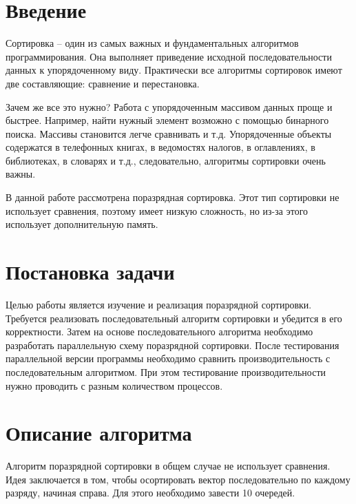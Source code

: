 \documentclass{report}
\begin{document}
	\tableofcontents

	\newpage
	

	\section*{Введение}
	\par Сортировка – один из самых важных и фундаментальных алгоритмов программирования. Она выполняет приведение исходной последовательности данных к упорядоченному виду. Практически все алгоритмы сортировок имеют две составляющие: сравнение и перестановка.
	
	\par Зачем же все это нужно? Работа с упорядоченным массивом данных проще и быстрее. Например, найти нужный элемент возможно с помощью бинарного поиска. Массивы становится легче сравнивать и т.д. Упорядоченные объекты содержатся в телефонных книгах, в ведомостях налогов, в оглавлениях, в библиотеках, в словарях и т.д., следовательно, алгоритмы сортировки очень важны.
	
	\par В данной работе рассмотрена поразрядная сортировка. Этот тип сортировки не использует сравнения, поэтому имеет низкую сложность, но из-за этого использует дополнительную память.
	
	\newpage
    \section*{Постановка задачи}
    \par Целью работы является изучение и реализация поразрядной сортировки. Требуется реализовать последовательный алгоритм сортировки и убедится в его корректности. Затем на основе последовательного алгоритма необходимо разработать параллельную схему поразрядной сортировки. После тестирования параллельной версии программы необходимо сравнить производительность с последовательным алгоритмом. При этом тестирование производительности нужно проводить с разным количеством процессов.
    
    \newpage
    \section*{Описание алгоритма}
    \par Алгоритм поразрядной сортировки в общем случае не использует сравнения. Идея заключается в том, чтобы осортировать вектор последовательно по каждому разряду, начиная справа. Для этого необходимо завести 10 очередей.
    
\end{document}
